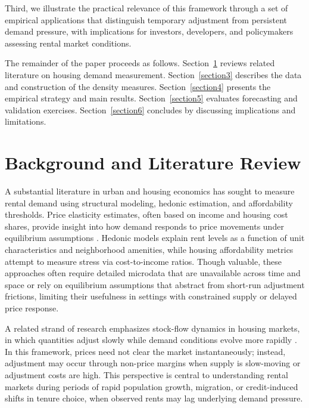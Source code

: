 \documentclass[pdflatex,sn-basic]{sn-jnl}%
\theoremstyle{thmstyleone}%
\theoremstyle{thmstyletwo}%
\theoremstyle{thmstylethree}%
\begin{document}
Third, we illustrate the practical relevance of this framework through a set of 
empirical applications that distinguish temporary adjustment from persistent demand 
pressure, with implications for investors, developers, and policymakers assessing 
rental market conditions.

The remainder of the paper proceeds as follows. Section~\ref{section2}  reviews related literature on housing demand measurement. Section~\ref{section3}  describes the data and construction of the density measures. Section~\ref{section4} presents the empirical strategy and main results. Section~\ref{section5} evaluates forecasting and validation exercises. Section~\ref{section6} concludes by discussing implications and limitations.

\section{Background and Literature Review}\label{section2}

A substantial literature in urban and housing economics has sought to measure rental
demand using structural modeling, hedonic estimation, and affordability thresholds.
Price elasticity estimates, often based on income and housing cost shares, provide
insight into how demand responds to price movements under equilibrium assumptions
\cite{green2002measuring, malpezzi1996rent}. Hedonic models explain rent levels as a
function of unit characteristics and neighborhood amenities, while housing affordability
metrics attempt to measure stress via cost-to-income ratios. Though valuable, these
approaches often require detailed microdata that are unavailable across time and space
or rely on equilibrium assumptions that abstract from short-run adjustment frictions,
limiting their usefulness in settings with constrained supply or delayed price response.

A related strand of research emphasizes stock-flow dynamics in housing markets, in
which quantities adjust slowly while demand conditions evolve more rapidly
\cite{wheaton1991realestate, goodman1992rental}. In this framework, prices need not
clear the market instantaneously; instead, adjustment may occur through non-price
margins when supply is slow-moving or adjustment costs are high. This perspective is
central to understanding rental markets during periods of rapid population growth,
migration, or credit-induced shifts in tenure choice, when observed rents may lag
underlying demand pressure.
\end{document}
